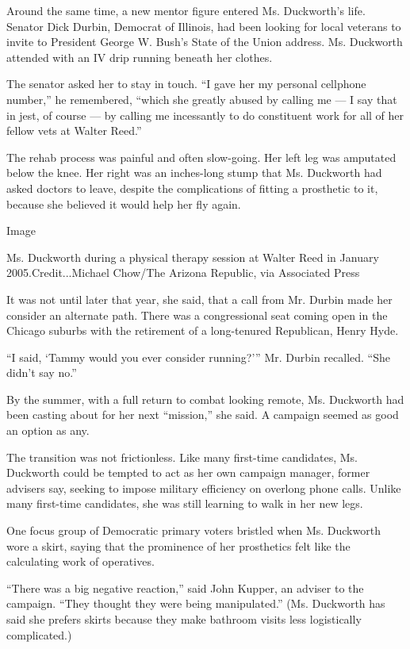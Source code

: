 Around the same time, a new mentor figure entered Ms. Duckworth's life.
Senator Dick Durbin, Democrat of Illinois, had been looking for local
veterans to invite to President George W. Bush's State of the Union
address. Ms. Duckworth attended with an IV drip running beneath her
clothes.

The senator asked her to stay in touch. ``I gave her my personal
cellphone number,'' he remembered, ``which she greatly abused by calling
me --- I say that in jest, of course --- by calling me incessantly to do
constituent work for all of her fellow vets at Walter Reed.''

The rehab process was painful and often slow-going. Her left leg was
amputated below the knee. Her right was an inches-long stump that Ms.
Duckworth had asked doctors to leave, despite the complications of
fitting a prosthetic to it, because she believed it would help her fly
again.

Image

Ms. Duckworth during a physical therapy session at Walter Reed in
January 2005.Credit...Michael Chow/The Arizona Republic, via Associated
Press

It was not until later that year, she said, that a call from Mr. Durbin
made her consider an alternate path. There was a congressional seat
coming open in the Chicago suburbs with the retirement of a long-tenured
Republican, Henry Hyde.

``I said, `Tammy would you ever consider running?''' Mr. Durbin
recalled. ``She didn't say no.''

By the summer, with a full return to combat looking remote, Ms.
Duckworth had been casting about for her next ``mission,'' she said. A
campaign seemed as good an option as any.

The transition was not frictionless. Like many first-time candidates,
Ms. Duckworth could be tempted to act as her own campaign manager,
former advisers say, seeking to impose military efficiency on overlong
phone calls. Unlike many first-time candidates, she was still learning
to walk in her new legs.

One focus group of Democratic primary voters bristled when Ms. Duckworth
wore a skirt, saying that the prominence of her prosthetics felt like
the calculating work of operatives.

``There was a big negative reaction,'' said John Kupper, an adviser to
the campaign. ``They thought they were being manipulated.'' (Ms.
Duckworth has said she prefers skirts because they make bathroom visits
less logistically complicated.)

